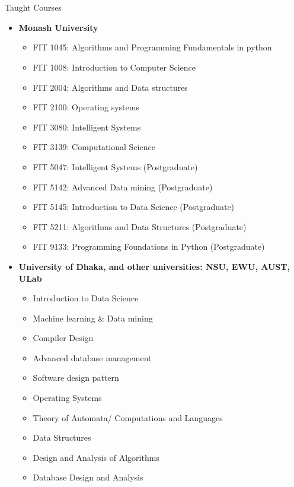 \section{\faLineChart}{Taught Courses}
\begin{itemize}[noitemsep]
    \item \textbf{Monash University}
        \begin{itemize}[noitemsep]
            \item FIT 1045: Algorithms and Programming Fundamentals in python
            \item FIT 1008: Introduction to Computer Science
            \item FIT 2004: Algorithms and Data structures
            \item FIT 2100: Operating systems
            \item FIT 3080: Intelligent Systems
            \item FIT 3139: Computational Science
            \item FIT 5047: Intelligent Systems (Postgraduate)
            \item FIT 5142: Advanced Data mining (Postgraduate)
            \item FIT 5145: Introduction to Data Science (Postgraduate)
            \item FIT 5211: Algorithms and Data Structures (Postgraduate)
            \item FIT 9133: Programming Foundations in Python (Postgraduate)
        \end{itemize}
    \item \textbf{University of Dhaka, and other universities: NSU, EWU, AUST, ULab}
        \begin{itemize}[noitemsep]
            \item Introduction to Data Science
            \item Machine learning \& Data mining
            \item Compiler Design 
            \item Advanced database management
            \item Software design pattern
            \item Operating Systems
            \item Theory of Automata/ Computations and Languages
            \item Data Structures
            \item Design and Analysis of Algorithms
            \item Database Design and Analysis
        \end{itemize}
\end{itemize}